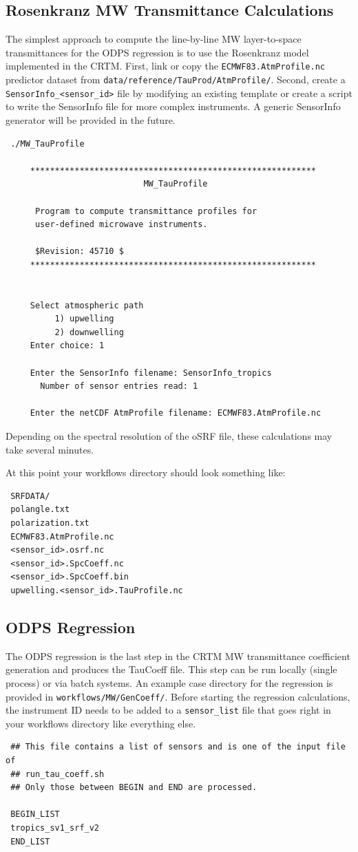 \subsection{Rosenkranz MW Transmittance Calculations}
The simplest approach to compute the line-by-line MW layer-to-space transmittances for the ODPS regression is to use the Rosenkranz model implemented in the CRTM.
First, link or copy the \verb|ECMWF83.AtmProfile.nc| predictor dataset from \verb|data/reference/TauProd/AtmProfile/|.
Second, create a \verb|SensorInfo_<sensor_id>| file by modifying an existing template or create a script to write the SensorInfo file for more complex instruments.
A generic SensorInfo generator will be provided in the future. 

 \begin{verbatim}
 ./MW_TauProfile 

     **********************************************************
                            MW_TauProfile

      Program to compute transmittance profiles for 
      user-defined microwave instruments.

      $Revision: 45710 $
     **********************************************************


     Select atmospheric path
          1) upwelling  
          2) downwelling
     Enter choice: 1

     Enter the SensorInfo filename: SensorInfo_tropics
       Number of sensor entries read: 1

     Enter the netCDF AtmProfile filename: ECMWF83.AtmProfile.nc
\end{verbatim}

Depending on the spectral resolution of the oSRF file, these calculations may take several minutes.  

At this point your workflows directory should look something like:
\begin{verbatim}
 SRFDATA/
 polangle.txt
 polarization.txt
 ECMWF83.AtmProfile.nc
 <sensor_id>.osrf.nc
 <sensor_id>.SpcCoeff.nc
 <sensor_id>.SpcCoeff.bin
 upwelling.<sensor_id>.TauProfile.nc
\end{verbatim}

\subsection{ODPS Regression}
The ODPS regression is the last step in the CRTM MW transmittance coefficient generation and produces the TauCoeff file.
This step can be run locally (single process) or via batch systems. An example case directory for the regression is provided in \verb|workflows/MW/GenCoeff/|.
Before starting the regression calculations, the instrument ID needs to be added to a \verb|sensor_list| file that goes right in your workflows directory like everything else.
\begin{verbatim}
 ## This file contains a list of sensors and is one of the input file of
 ## run_tau_coeff.sh
 ## Only those between BEGIN and END are processed.

 BEGIN_LIST
 tropics_sv1_srf_v2
 END_LIST
\end{verbatim}

